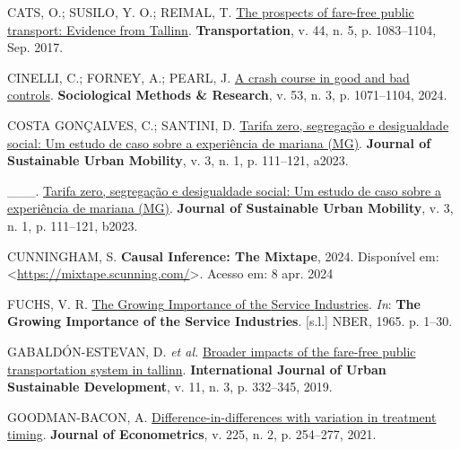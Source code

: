 \documentclass[12pt, a4paper, twoside]{article}
\numberwithin{equation}{subsection} %
\newlength{\cslhangindent}
\newlength{\cslentryspacingunit} %
\newenvironment{CSLReferences}[2] %
 {%
  \setlength{\parindent}{0pt}
  \ifodd #1
  \let\oldpar\par
  \def\par{\hangindent=\cslhangindent\oldpar}
  \fi
  \setlength{\parskip}{#2\cslentryspacingunit}
 }%
 {}
\begin{document}
\begin{CSLReferences}{0}{0}
\leavevmode{}%
CATS, O.; SUSILO, Y. O.; REIMAL, T.
\href{https://doi.org/10.1007/s11116-016-9695-5}{The prospects of
fare-free public transport: Evidence from {Tallinn}}.
\textbf{Transportation}, v. 44, n. 5, p. 1083--1104, Sep. 2017.

\leavevmode{}%
CINELLI, C.; FORNEY, A.; PEARL, J.
\href{https://doi.org/10.1177/00491241221099552}{A crash course in good
and bad controls}. \textbf{Sociological Methods \& Research}, v. 53, n.
3, p. 1071--1104, 2024.

\leavevmode{}%
COSTA GONÇALVES, C.; SANTINI, D.
\href{https://doi.org/10.53613/josum.2023.v3.009}{Tarifa zero,
segregação e desigualdade social: Um estudo de caso sobre a experiência
de mariana (MG)}. \textbf{Journal of Sustainable Urban Mobility}, v. 3,
n. 1, p. 111--121, a2023.

\leavevmode{}%
\_\_\_. \href{https://doi.org/10.53613/josum.2023.v3.009}{Tarifa zero,
segregação e desigualdade social: Um estudo de caso sobre a experiência
de mariana (MG)}. \textbf{Journal of Sustainable Urban Mobility}, v. 3,
n. 1, p. 111--121, b2023.

\leavevmode{}%
CUNNINGHAM, S. \textbf{Causal {Inference}: {The} {Mixtape}}, 2024.
Disponível em:
\textless{}\url{https://mixtape.scunning.com/}\textgreater. Acesso em: 8
apr. 2024

\leavevmode{}%
FUCHS, V. R.
\href{https://www.nber.org/books-and-chapters/growing-importance-service-industries/growing-importance-service-industries}{The
{Growing} {Importance} of the {Service} {Industries}}. \emph{In}:
\textbf{The {Growing} {Importance} of the {Service} {Industries}}.
{[}s.l.{]} NBER, 1965. p. 1--30.

\leavevmode{}%
GABALDÓN-ESTEVAN, D. \emph{et al.}
\href{https://doi.org/10.1080/19463138.2019.1596114}{Broader impacts of
the fare-free public transportation system in tallinn}.
\textbf{International Journal of Urban Sustainable Development}, v. 11,
n. 3, p. 332--345, 2019.

\leavevmode{}%
GOODMAN-BACON, A.
\href{https://doi.org/10.1016/j.jeconom.2021.03.014}{Difference-in-differences
with variation in treatment timing}. \textbf{Journal of Econometrics},
v. 225, n. 2, p. 254--277, 2021.


\end{CSLReferences}
\end{document}
